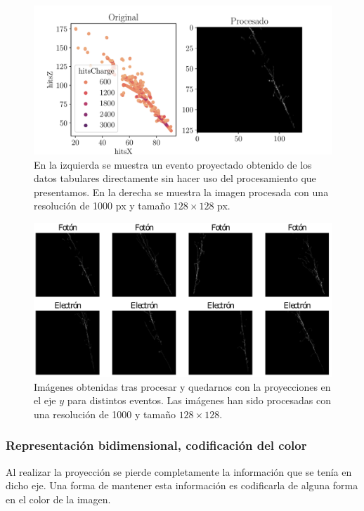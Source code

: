 \documentclass[a4paper,12pt,twoside,titlepage]{article}
\begin{document}
\begin{figure}[h!]
  \centering
  \includegraphics[scale=0.85, center]{ambas_pro.pdf}
  \caption{En la izquierda se muestra un evento proyectado obtenido de los datos tabulares directamente sin hacer uso del procesamiento que presentamos. En la derecha se muestra la imagen procesada con una resolución de 1000 px y tamaño $128\times128$ px.}
  \label{fig:varias_proyecciones}
\end{figure}

\begin{figure}[h!]
  \centering
  \includegraphics[scale=0.75, center]{varias_proyecciones.pdf}
  \caption{Imágenes obtenidas tras procesar y quedarnos con la proyecciones en el eje $y$ para distintos eventos. Las imágenes han sido procesadas con una resolución de 1000 y tamaño $128\times128$.}
  \label{fig:muchas_proyecciones}
\end{figure}

\subsubsection*{Representación bidimensional, codificación del color}

Al realizar la proyección se pierde completamente la información que se tenía en dicho eje. Una forma de mantener esta información es codificarla de alguna forma en el color de la imagen.
\end{document}
